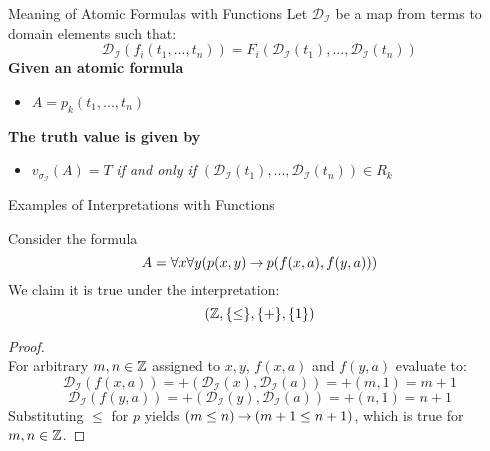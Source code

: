 \documentclass[style=sailor,size=12pt]{powerdot}
\begin{document}
\begin{wideslide}[bm=,toc=]{Meaning of Atomic Formulas with Functions}
Let $\mathcal{D}_{\mathcal{I}}$ be a map from terms to domain elements such
that:
\[
 \mathcal{D}_{\mathcal{I}} (f_i(t_1,...,t_n)) = F_i(\mathcal{D}_{\mathcal{I}}(t_1),...,\mathcal{D}_{\mathcal{I}}(t_n)) 
  \]
{\bf Given an atomic formula} 
\begin{itemize}
\item $A = p_k(t_1,...,t_n)$
\end{itemize}
{\bf The truth value is given by}
\begin{itemize}
\item $v_{\sigma_{\mathcal{I}}}(A) = T$ \emph{if and only if} $(\mathcal{D}_{\mathcal{I}}(t_1),...,\mathcal{D}_{\mathcal{I}}(t_n)) \in R_k$
\end{itemize}
\end{wideslide}
\begin{wideslide}[bm=,toc=]{Examples of Interpretations with Functions}
\begin{ex}{9.4}
Consider the formula
\[
  A = \forall x \forall y(p(x,y) \mathbin{\rightarrow} p(f(x,a),f(y,a)))
\]
We claim it is true under the interpretation:
\[
  (\mathbb{Z},\{\leq\}, \{+\}, \{1\}) 
\]
\vspace{-4ex}
\begin{proof}
~\\For arbitrary $m,n \in \mathbb{Z}$ assigned to $x,y$, $f(x,a)$ and $f(y,a)$ evaluate to:
\vspace{-1ex}
\[ \mathcal{D}_{\mathcal{I}}(f(x,a)) = +(\mathcal{D}_{\mathcal{I}}(x), \mathcal{D}_{\mathcal{I}}(a)) = +(m,1) = m+1 \]
\vspace{-4ex}
\[ \mathcal{D}_{\mathcal{I}}(f(y,a)) = +(\mathcal{D}_{\mathcal{I}}(y), \mathcal{D}_{\mathcal{I}}(a)) = +(n,1) = n+1 \]
Substituting $\leq$ for $p$ yields $(m \leq n) \mathbin{\rightarrow} (m+1 \leq n + 1)$, which is
true for $m,n \in \mathbb{Z}$.
\end{proof}
\end{ex}
\end{wideslide}
\end{document}
